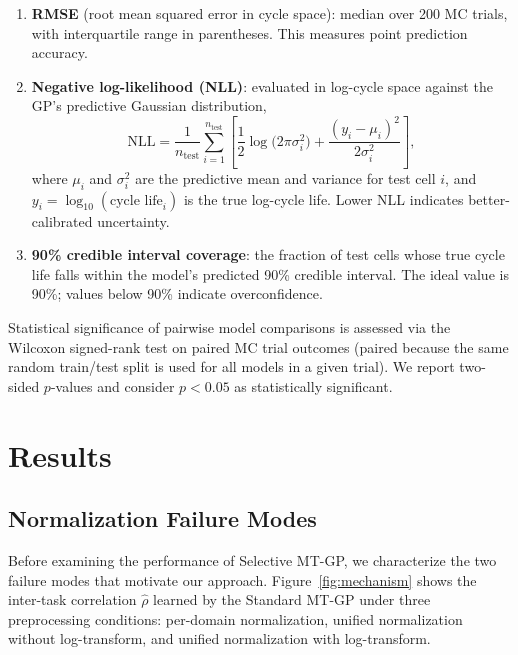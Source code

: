 \documentclass[12pt]{article}
\begin{document}
\begin{enumerate}
  \item \textbf{RMSE} (root mean squared error in cycle space): median over
  200 MC trials, with interquartile range in parentheses. This measures point
  prediction accuracy.

  \item \textbf{Negative log-likelihood (NLL)}: evaluated in log-cycle space
  against the GP's predictive Gaussian distribution,
  \begin{equation}
    \mathrm{NLL} = \frac{1}{n_{\mathrm{test}}}
    \sum_{i=1}^{n_{\mathrm{test}}} \left[
      \frac{1}{2}\log\!\bigl(2\pi\sigma_i^2\bigr)
      + \frac{(y_i - \mu_i)^2}{2\sigma_i^2}
    \right],
    \label{eq:nll}
  \end{equation}
  where $\mu_i$ and $\sigma_i^2$ are the predictive mean and variance for test
  cell $i$, and $y_i = \log_{10}(\text{cycle life}_i)$ is the true log-cycle
  life. Lower NLL indicates better-calibrated uncertainty.

  \item \textbf{90\% credible interval coverage}: the fraction of test cells
  whose true cycle life falls within the model's predicted 90\% credible
  interval. The ideal value is 90\%; values below 90\% indicate
  overconfidence.
\end{enumerate}

Statistical significance of pairwise model comparisons is assessed via the
Wilcoxon signed-rank test on paired MC trial outcomes (paired because the same
random train/test split is used for all models in a given trial). We report
two-sided $p$-values and consider $p < 0.05$ as statistically significant.

\section{Results}
\label{sec:results}

\subsection{Normalization Failure Modes}

Before examining the performance of Selective MT-GP, we characterize the two
failure modes that motivate our approach. Figure~\ref{fig:mechanism} shows the
inter-task correlation $\hat{\rho}$ learned by the Standard MT-GP under three
preprocessing conditions: per-domain normalization, unified normalization
without log-transform, and unified normalization with log-transform.
\end{document}
